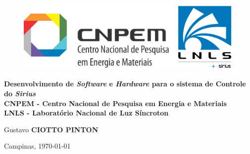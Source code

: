 \begin{titlepage}
\vspace*{.23\textheight}
\begin{center}
%
\begin{figure}[h]
    \centering
    \includegraphics[scale=0.14]{image/CNPEM_LNLS}
\end{figure} 

%
\vspace*{10pt}
\textbf{\LARGE Desenvolvimento de \textit{Software} e \textit{Hardware} para o
sistema de Controle do \textit{Sirius}}
\\
\vspace{12pt} 
\textbf{CNPEM - Centro Nacional de Pesquisa em Energia e Materiais} \\ \vspace{12pt} 
\textbf{LNLS - Laboratório Nacional de Luz Síncroton} \\
\vspace*{72pt}

Gustavo \textbf{CIOTTO PINTON}
 
Campinas, \today

\end{center}
\end{titlepage} 

\newpage